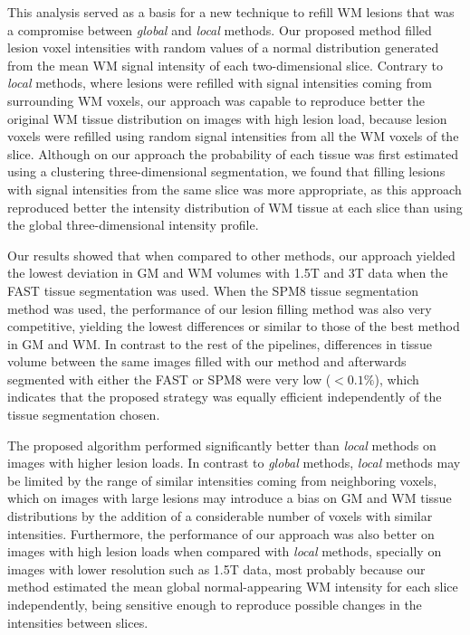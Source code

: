 This analysis served as a basis for a new technique to refill WM lesions that was a compromise between \textit{global} and \textit{local} methods. Our proposed method filled lesion voxel intensities with random values of a normal distribution generated from the mean WM signal intensity of each two-dimensional slice. Contrary to \textit{local} methods, where lesions were refilled with signal intensities coming from surrounding WM voxels, our approach was capable to reproduce better the original WM tissue distribution on images with high lesion load, because lesion voxels were refilled using random signal intensities from all the WM voxels of the slice. Although on our approach the probability of each tissue was first estimated using a clustering three-dimensional segmentation, we found that filling lesions with signal intensities from the same slice was more appropriate, as this approach reproduced better the intensity distribution of WM tissue at each slice than using the global three-dimensional intensity profile.

Our results showed that when compared to other methods, our approach yielded the lowest deviation in GM and WM volumes with 1.5T and 3T data when the FAST tissue segmentation was used. When the SPM8 tissue segmentation method was used, the performance of our lesion filling method was also very competitive, yielding the lowest differences or similar to those of the best method in GM and WM. In contrast to the rest of the pipelines, differences in tissue volume between the same images filled with our method and afterwards segmented with either the FAST or SPM8 were very low ($<0.1\%$), which indicates that the proposed strategy was equally efficient independently of the tissue segmentation chosen.

The proposed algorithm performed significantly better than \textit{local} methods on images with higher lesion loads. In contrast to \textit{global} methods, \textit{local} methods may be limited by the range of similar intensities coming from neighboring voxels, which on images with large lesions may introduce a bias on GM and WM tissue distributions by the addition of a considerable number of voxels with similar intensities. Furthermore, the performance of our approach was also better on images with high lesion loads when compared with \textit{local} methods, specially on images with lower resolution such as 1.5T data, most probably because our method estimated the mean global normal-appearing WM intensity for each slice independently, being sensitive enough to reproduce possible changes in the intensities between slices.


